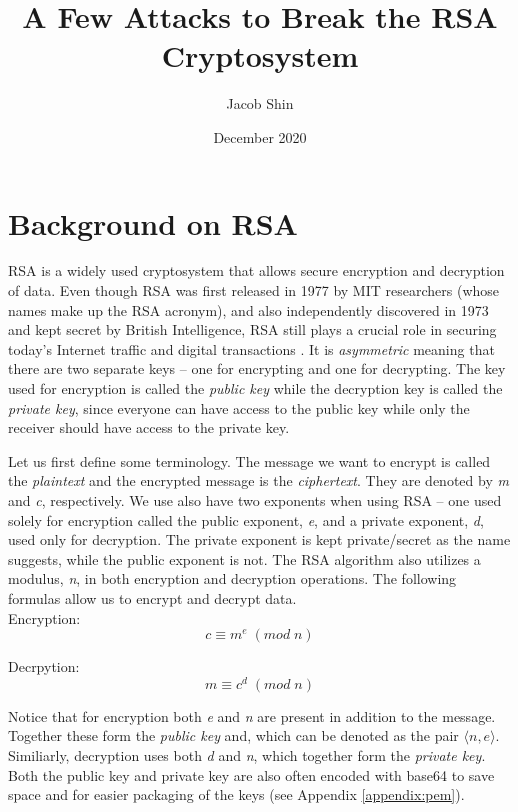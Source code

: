 \documentclass[11pt]{article}
\title{A Few Attacks to Break the RSA Cryptosystem}
\author{Jacob Shin}
\date{December 2020}
\begin{document}
\maketitle


\section{Background on RSA}
RSA is a widely used cryptosystem that allows secure encryption and decryption of data. Even though RSA was first released in 1977 by MIT researchers (whose names make up the RSA acronym), and also independently discovered in 1973 and kept secret by British Intelligence, RSA still plays a crucial role in securing today's Internet traffic and digital transactions \cite{boneh, rosen}. It is \emph{asymmetric} meaning that there are two separate keys -- one for encrypting and one for decrypting. The key used for encryption is called the \emph{public key} while the decryption key is called the \emph{private key}, since everyone can have access to the public key while only the receiver should have access to the private key.

Let us first define some terminology. The message we want to encrypt is called the \emph{plaintext} and the encrypted message is the \emph{ciphertext}. They are denoted by \emph{m} and \emph{c}, respectively. We use also have two exponents when using RSA -- one used solely for encryption called the public exponent, \emph{e}, and a private exponent, \emph{d}, used only for decryption. The private exponent is kept private/secret as the name suggests, while the public exponent is not. The RSA algorithm also utilizes a modulus, \emph{n}, in both encryption and decryption operations. The following formulas allow us to encrypt and decrypt data.\\

Encryption:
$$ c \equiv m^e \; (mod \; n)$$

Decrpytion:
$$ m \equiv c^d \; (mod \; n)$$

Notice that for encryption both \emph{e} and \emph{n} are present in addition to the message. Together these form the \emph{public key} and, which can be denoted as the pair $\langle n, e \rangle$. Similiarly, decryption uses both \emph{d} and \emph{n}, which together form the \emph{private key}. Both the public key and private key are also often encoded with base64 to save space and for easier packaging of the keys (see Appendix \ref{appendix:pem}).\\
\end{document}
